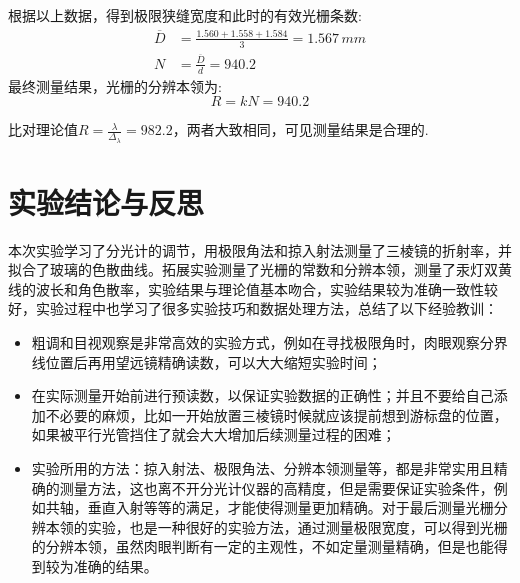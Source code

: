 \documentclass[12pt]{article}
\begin{document}
根据以上数据，得到极限狭缝宽度和此时的有效光栅条数:
\begin{equation*}
\begin{aligned}
\overline{D}&=\frac{1.560+1.558+1.584}{3}=1.567\,mm \\
N&=\frac{\overline D}{d}=940.2
\end{aligned}
\end{equation*}
\quad 最终测量结果，光栅的分辨本领为:
\begin{equation}
    R=kN=940.2
\end{equation}

比对理论值$R=\frac{\lambda}{\Delta_{\lambda}}=982.2$，两者大致相同，可见测量结果是合理的.

\section{实验结论与反思}
\quad 本次实验学习了分光计的调节，用极限角法和掠入射法测量了三棱镜的折射率，并拟合了玻璃的色散曲线。拓展实验测量了光栅的常数和分辨本领，测量了汞灯双黄线的波长和角色散率，实验结果与理论值基本吻合，实验结果较为准确一致性较好，实验过程中也学习了很多实验技巧和数据处理方法，总结了以下经验教训：
\begin{itemize}
    \item 粗调和目视观察是非常高效的实验方式，例如在寻找极限角时，肉眼观察分界线位置后再用望远镜精确读数，可以大大缩短实验时间；
    \item 在实际测量开始前进行预读数，以保证实验数据的正确性；并且不要给自己添加不必要的麻烦，比如一开始放置三棱镜时候就应该提前想到游标盘的位置，如果被平行光管挡住了就会大大增加后续测量过程的困难；
    \item 实验所用的方法：掠入射法、极限角法、分辨本领测量等，都是非常实用且精确的测量方法，这也离不开分光计仪器的高精度，但是需要保证实验条件，例如共轴，垂直入射等等的满足，才能使得测量更加精确。对于最后测量光栅分辨本领的实验，也是一种很好的实验方法，通过测量极限宽度，可以得到光栅的分辨本领，虽然肉眼判断有一定的主观性，不如定量测量精确，但是也能得到较为准确的结果。
\end{itemize}
\end{document}
